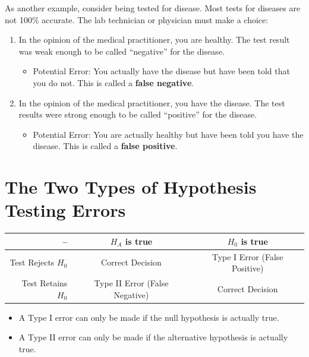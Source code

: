 \documentclass[
]{book}
\providecommand{\tightlist}{%
  \setlength{\itemsep}{0pt}\setlength{\parskip}{0pt}}
\begin{document}
As another example, consider being tested for disease. Most tests for diseases are not 100\% accurate. The lab technician or physician must make a choice:

\begin{enumerate}
\def\labelenumi{\arabic{enumi}.}
\tightlist
\item
  In the opinion of the medical practitioner, you are healthy. The test result was weak enough to be called ``negative'' for the disease.

  \begin{itemize}
  \tightlist
  \item
    Potential Error: You actually have the disease but have been told that you do not. This is called a \textbf{false negative}.
  \end{itemize}
\item
  In the opinion of the medical practitioner, you have the disease. The test results were strong enough to be called ``positive'' for the disease.

  \begin{itemize}
  \tightlist
  \item
    Potential Error: You are actually healthy but have been told you have the disease. This is called a \textbf{false positive}.
  \end{itemize}
\end{enumerate}

\hypertarget{the-two-types-of-hypothesis-testing-errors}{%
\section{The Two Types of Hypothesis Testing Errors}\label{the-two-types-of-hypothesis-testing-errors}}

\begin{longtable}[]{@{}rcc@{}}
\toprule
-- & \(H_A\) is true & \(H_0\) is true\tabularnewline
\midrule
\endhead
Test Rejects \(H_0\) & Correct Decision & Type I Error (False Positive)\tabularnewline
Test Retains \(H_0\) & Type II Error (False Negative) & Correct Decision\tabularnewline
\bottomrule
\end{longtable}

\begin{itemize}
\tightlist
\item
  A Type I error can only be made if the null hypothesis is actually true.
\item
  A Type II error can only be made if the alternative hypothesis is actually true.
\end{itemize}
\end{document}
